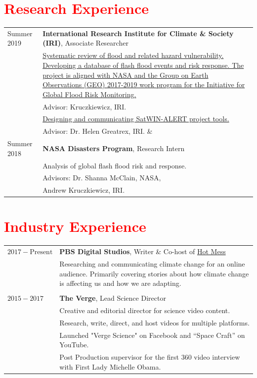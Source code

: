 \documentclass[margin,line,palatino,courier,10pt]{res}
\begin{document}
\begin{resume}
\section{\sc \textcolor{Red}{\large{Research Experience}}}
\vspace*{0.05in}
\begin{tabular}{@{}p{1 in}p{4in}}
Summer 2019  & \textbf{International Research Institute for Climate \& Society (IRI)}, Associate Researcher\\
& \href{GEO}{Systematic review of flood and related hazard vulnerability. Developing a database of flash flood events and risk response. The project is aligned with NASA and the Group on Earth Observations (GEO) 2017-2019 work program for the Initiative for Global Flood Risk Monitoring.} \\
& \hspace{0.2in} Advisor: Kruczkiewicz, IRI.\\
& \href{SatWIN}{Designing and communicating SatWIN-ALERT project tools.} \\
& \hspace{0.2in} Advisor: Dr. Helen Greatrex, IRI. \& 
\\
Summer 2018 & \textbf{NASA Disasters Program}, Research Intern  \\
& Analysis of global flash flood risk and response.  \\
& \hspace{0.2in} Advisors:  Dr. Shanna McClain, NASA, \\
& \hspace{.82in} Andrew Kruczkiewicz, IRI. \\

\end{tabular}

\section{\sc \textcolor{Red}{\large{Industry Experience}}}
\vspace*{0.05in}
\begin{tabular}{@{}p{1 in}p{4in}}
$2017 - \text{Present}$  & \textbf{PBS Digital Studios}, Writer \& Co-host of \href{HM}{Hot Mess}\\
& Researching and communicating climate change for an online audience. Primarily covering stories about how climate change is affecting us and how we are adapting.\\
\\
$2015 - 2017$ & \textbf{The Verge}, Lead Science Director  \\
& Creative and editorial director for science video content. \\
& Research, write, direct, and host videos for multiple platforms. \\
& Launched "Verge Science" on Facebook and “Space Craft” on YouTube. \\
& Post Production supervisor for the first 360 video interview with First Lady Michelle Obama. \\


\end{tabular}
\end{resume}
\end{document}
